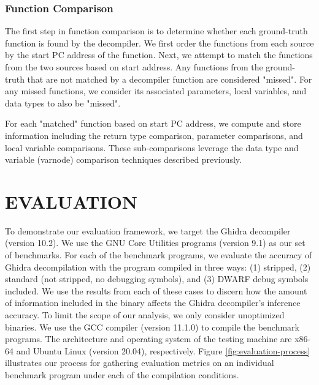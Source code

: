 \documentclass[a4paper,twoside]{article}
\begin{document}

\subsubsection{Function Comparison}

The first step in function comparison is to determine whether each ground-truth function is found by the decompiler. We first order the functions from each source by the start PC address of the function. Next, we attempt to match the functions from the two sources based on start address. Any functions from the ground-truth that are not matched by a decompiler function are considered "missed". For any missed functions, we consider its associated parameters, local variables, and data types to also be "missed".

For each "matched" function based on start PC address, we compute and store information including the return type comparison, parameter comparisons, and local variable comparisons. These sub-comparisons leverage the data type and variable  (varnode) comparison techniques described previously.


\section{\uppercase{Evaluation}} \label{sec:evaluation}

To demonstrate our evaluation framework, we target the Ghidra decompiler (version 10.2). We use the GNU Core Utilities programs (version 9.1) as our set of benchmarks. For each of the benchmark programs, we evaluate the accuracy of Ghidra decompilation with the program compiled in three ways: (1) stripped, (2) standard (not stripped, no debugging symbols), and (3) DWARF debug symbols included. We use the results from each of these cases to discern how the amount of information included in the binary affects the Ghidra decompiler's inference accuracy. To limit the scope of our analysis, we only consider unoptimized binaries. We use the GCC compiler (version 11.1.0) to compile the benchmark programs. The architecture and operating system of the testing machine are x86-64 and Ubuntu Linux (version 20.04), respectively. Figure \ref{fig:evaluation-process} illustrates our process for gathering evaluation metrics on an individual benchmark program under each of the compilation conditions.
\end{document}
